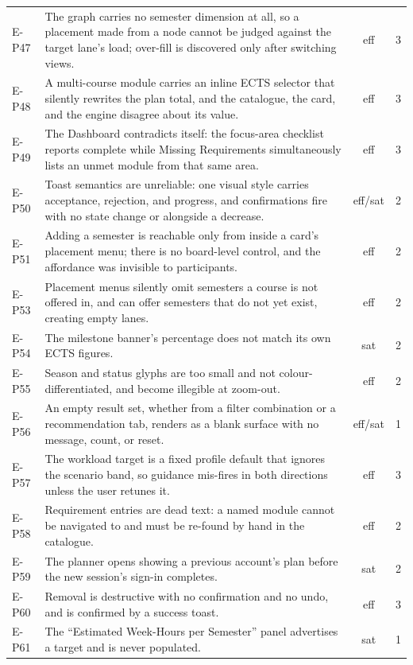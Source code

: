 \begin{longtable}{p{1.6cm}p{9.6cm}cc}
    E-P47 & The graph carries no semester dimension at all, so a placement made from a node cannot be judged against the target lane's load; over-fill is discovered only after switching views. & eff & 3 \\
    E-P48 & A multi-course module carries an inline ECTS selector that silently rewrites the plan total, and the catalogue, the card, and the engine disagree about its value. & eff & 3 \\
    E-P49 & The Dashboard contradicts itself: the focus-area checklist reports complete while Missing Requirements simultaneously lists an unmet module from that same area. & eff & 3 \\
    E-P50 & Toast semantics are unreliable: one visual style carries acceptance, rejection, and progress, and confirmations fire with no state change or alongside a decrease. & eff/sat & 2 \\
    E-P51 & Adding a semester is reachable only from inside a card's placement menu; there is no board-level control, and the affordance was invisible to participants. & eff & 2 \\
    E-P53 & Placement menus silently omit semesters a course is not offered in, and can offer semesters that do not yet exist, creating empty lanes. & eff & 2 \\
    E-P54 & The milestone banner's percentage does not match its own ECTS figures. & sat & 2 \\
    E-P55 & Season and status glyphs are too small and not colour-differentiated, and become illegible at zoom-out. & eff & 2 \\
    E-P56 & An empty result set, whether from a filter combination or a recommendation tab, renders as a blank surface with no message, count, or reset. & eff/sat & 1 \\
    E-P57 & The workload target is a fixed profile default that ignores the scenario band, so guidance mis-fires in both directions unless the user retunes it. & eff & 3 \\
    E-P58 & Requirement entries are dead text: a named module cannot be navigated to and must be re-found by hand in the catalogue. & eff & 2 \\
    E-P59 & The planner opens showing a previous account's plan before the new session's sign-in completes. & sat & 2 \\
    E-P60 & Removal is destructive with no confirmation and no undo, and is confirmed by a success toast. & eff & 3 \\
    E-P61 & The \enquote{Estimated Week-Hours per Semester} panel advertises a target and is never populated. & sat & 1 \\

\end{longtable}
